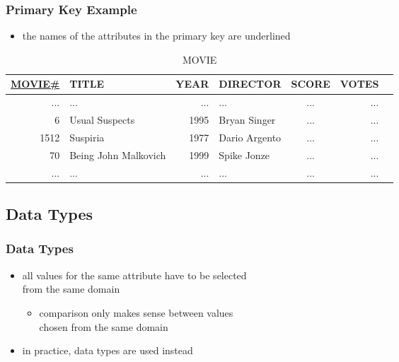 \documentclass[dvipsnames]{beamer}
\theoremstyle{plain}
\begin{document}
\begin{frame}
  \frametitle{Primary Key Example}

  \begin{itemize}
    \item the names of the attributes in the primary key are underlined
  \end{itemize}

  \begin{example}
    \begin{tiny}
    \begin{table}
      \caption{MOVIE}
      \begin{tabular}{|r|l|r|l|c|r|r|}\hline
\underline{MOVIE\#} & TITLE & YEAR & DIRECTOR      & SCORE & VOTES\\[2pt]\hline\hline
 ... & ...                  &  ... & ...           &   ... &   ...\\\hline
   6 & Usual Suspects       & 1995 & Bryan Singer  &   ... &   ...\\\hline
1512 & Suspiria             & 1977 & Dario Argento &   ... &   ...\\\hline
  70 & Being John Malkovich & 1999 & Spike Jonze   &   ... &   ...\\\hline
 ... & ...                  &  ... & ...           &   ... &   ...\\\hline
      \end{tabular}
    \end{table}
    \end{tiny}
  \end{example}
\end{frame}

\subsection{Data Types}

\begin{frame}
  \frametitle{Data Types}

  \begin{itemize}
    \item all values for the same attribute have to be selected\\
      from the same domain
    \begin{itemize}
      \item comparison only makes sense between values\\
        chosen from the same domain
    \end{itemize}

    \pause
    \medskip
    \item in practice, data types are used instead
  \end{itemize}
\end{frame}
\end{document}
